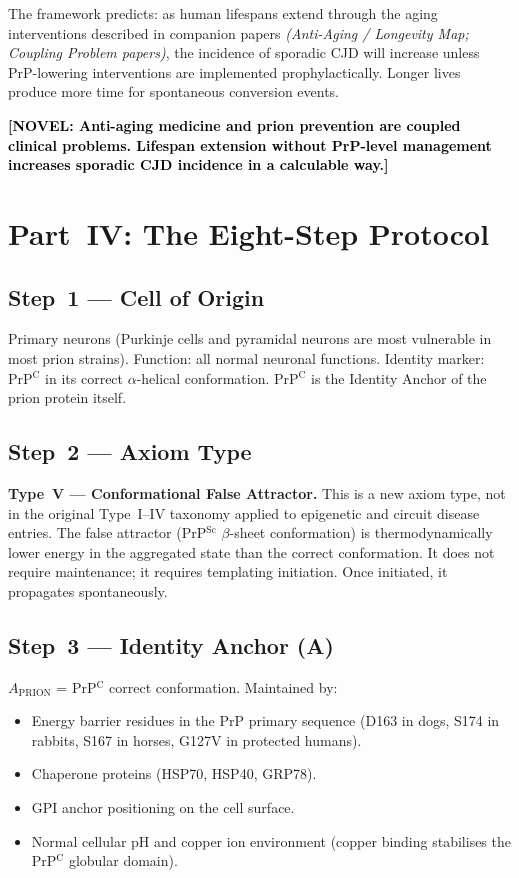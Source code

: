 \documentclass[12pt,a4paper]{article}
\newcommand{\prpc}{PrP$^{\mathrm{C}}$}
\newcommand{\prpsc}{PrP$^{\mathrm{Sc}}$}
\newcommand{\novel}[1]{\textbf{\textcolor{black}{[NOVEL: #1]}}}
\begin{document}
The framework predicts: as human lifespans extend through the aging
interventions described in companion papers \textit{(Anti-Aging / Longevity
Map; Coupling Problem papers)}, the incidence of sporadic CJD will increase
unless PrP-lowering interventions are implemented prophylactically.
Longer lives produce more time for spontaneous conversion events.

\novel{Anti-aging medicine and prion prevention are coupled clinical problems.
Lifespan extension without PrP-level management increases sporadic CJD
incidence in a calculable way.}

\section{Part~IV: The Eight-Step Protocol}

\subsection{Step~1 --- Cell of Origin}

Primary neurons (Purkinje cells and pyramidal neurons are most vulnerable
in most prion strains). Function: all normal neuronal functions.
Identity marker: \prpc{} in its correct $\alpha$-helical conformation.
\prpc{} is the Identity Anchor of the prion protein itself.

\subsection{Step~2 --- Axiom Type}

\textbf{Type~V --- Conformational False Attractor.} This is a new axiom
type, not in the original Type~I--IV taxonomy applied to epigenetic and
circuit disease entries. The false attractor (\prpsc{} $\beta$-sheet
conformation) is thermodynamically lower energy in the aggregated state
than the correct conformation. It does not require maintenance; it
requires templating initiation. Once initiated, it propagates
spontaneously.

\subsection{Step~3 --- Identity Anchor (A)}

$A_{\mathrm{PRION}}$ = \prpc{} correct conformation. Maintained by:
\begin{itemize}
  \item Energy barrier residues in the PrP primary sequence (D163 in
    dogs, S174 in rabbits, S167 in horses, G127V in protected humans).
  \item Chaperone proteins (HSP70, HSP40, GRP78).
  \item GPI anchor positioning on the cell surface.
  \item Normal cellular pH and copper ion environment (copper binding
    stabilises the \prpc{} globular domain).
\end{itemize}
\end{document}
